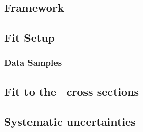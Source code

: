 \subsection{\fastnlo Framework}
\label{subsec:fastnlo}


%

\subsection{Fit Setup}
\label{subsec:fitsettings}


\subsubsection{Data Samples}
\label{subsec:aspdffitdata}


\subsection{Fit to the \dsdetjetb~cross sections}
\label{subsec:doubledifasfit}



\subsection{Systematic uncertainties}
\label{subsec:assysunc}


